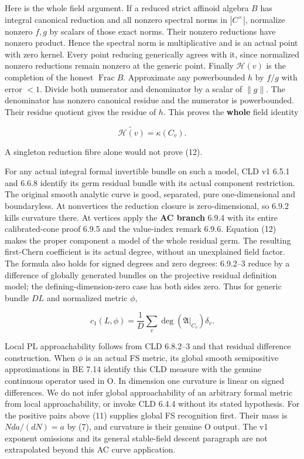 \documentclass[
  11pt,
]{article}
\begin{document}
Here is the whole field argument. If a reduced strict affinoid algebra
\(B\) has integral canonical reduction and all nonzero spectral norms in
\(|C^\times|\), normalize nonzero \(f,g\) by scalars of those exact
norms. Their nonzero reductions have nonzero product. Hence the spectral
norm is multiplicative and is an actual point with zero kernel. Every
point reducing generically agrees with it, since normalized nonzero
reductions remain nonzero at the generic point. Finally
\(\mathcal H(v)\) is the completion of the honest
\(\operatorname{Frac}B\). Approximate any powerbounded \(h\) by \(f/g\)
with error \(<1\). Divide both numerator and denominator by a scalar of
\(\|g\|\). The denominator has nonzero canonical residue and the
numerator is powerbounded. Their residue quotient gives the residue of
\(h\). This proves the \textbf{whole} field identity

\[
                   \widetilde{\mathcal H(v)}=\kappa(C_v).          \tag{12}
\]

A singleton reduction fibre alone would not prove (12).

For any actual integral formal invertible bundle on such a model, CLD v1
6.5.1 and 6.6.8 identify its germ residual bundle with its actual
component restriction. The original smooth analytic curve is good,
separated, pure one-dimensional and boundaryless. At nonvertices the
reduction closure is zero-dimensional, so 6.9.2 kills curvature there.
At vertices apply the \textbf{AC branch} 6.9.4 with its entire
calibrated-cone proof 6.9.5 and the value-index remark 6.9.6. Equation
(12) makes the proper component a model of the whole residual germ. The
resulting first-Chern coefficient is its actual degree, without an
unexplained field factor. The formula also holds for signed degrees and
zero degrees: 6.9.2--3 reduce by a difference of globally generated
bundles on the projective residual definition model; the
defining-dimension-zero case has both sides zero. Thus for generic
bundle \(DL\) and normalized metric \(\phi\),

\[
                 c_1(L,\phi)=\frac1D\sum_v
                       \deg(\mathfrak A|_{C_v})\delta_v.           \tag{13}
\]

Local PL approachability follows from CLD 6.8.2--3 and that residual
difference construction. When \(\phi\) is an actual FS metric, its
global smooth semipositive approximations in BE 7.14 identify this CLD
measure with the genuine continuous operator used in O. In dimension one
curvature is linear on signed differences. We do not infer global
approachability of an arbitrary formal metric from local
approachability, or invoke CLD 6.4.4 without its stated hypothesis. For
the positive pairs above (11) supplies global FS recognition first.
Their mass is \(Nda/(dN)=a\) by (7), and curvature is their genuine O
output. The v1 exponent omissions and its general stable-field descent
paragraph are not extrapolated beyond this AC curve application.
\end{document}

